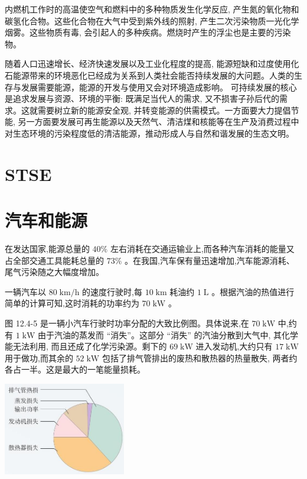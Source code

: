 \documentclass[10pt]{article}
\begin{document}
内燃机工作时的高温使空气和燃料中的多种物质发生化学反应, 产生氮的氧化物和碳氢化合物。这些化合物在大气中受到紫外线的照射, 产生二次污染物质一光化学烟雾。这些物质有毒, 会引起人的多种疾病。燃烧时产生的浮尘也是主要的污染物。

随着人口迅速增长、经济快速发展以及工业化程度的提高, 能源短缺和过度使用化石能源带来的环境恶化已经成为关系到人类社会能否持续发展的大问题。人类的生存与发展需要能源，能源的开发与使用又会对环境造成影响。 可持续发展的核心是追求发展与资源、环境的平衡: 既满足当代人的需求, 又不损害子孙后代的需求。这就需要树立新的能源安全观, 并转变能源的供需模式。一方面要大力提倡节能, 另一方面要发展可再生能源以及天然气、清洁煤和核能等在生产及消费过程中对生态环境的污染程度低的清洁能源，推动形成人与自然和谐发展的生态文明。

\section*{STSE}

\section*{汽车和能源}

在发达国家,能源总量的 \({40}\%\) 左右消耗在交通运输业上,而各种汽车消耗的能量又占全部交通工具能耗总量的 \({73}\%\) 。在我国,汽车保有量迅速增加,汽车能源消耗、尾气污染随之大幅度增加。

一辆汽车以 \({80}\mathrm{\;{km}}/\mathrm{h}\) 的速度行驶时,每 \({10}\mathrm{\;{km}}\) 耗油约 \(1\mathrm{\;L}\) 。根据汽油的热值进行简单的计算可知,这时消耗的功率约为 \({70}\mathrm{\;{kW}}\) 。

图 12.4-5 是一辆小汽车行驶时功率分配的大致比例图。具体说来,在 \({70}\mathrm{\;{kW}}\) 中,约有 \(1\mathrm{\;{kW}}\) 由于汽油的蒸发而 “消失”。这部分 “消失” 的汽油分散到大气中, 其化学能无法利用, 而且还成了化学污染源。剩下的 \({69}\mathrm{\;{kW}}\) 进入发动机,大约只有 \({17}\mathrm{\;{kW}}\) 用于做功,而其余的 \({52}\mathrm{\;{kW}}\) 包括了排气管排出的废热和散热器的热量散失, 两者约各占一半。这是最大的一笔能量损耗。

\begin{center}
\includegraphics[max width=0.4\textwidth]{images/01911d5f-8e38-70c0-b5b8-2b399bd115b6_103_186131.jpg}
\end{center}
\end{document}
